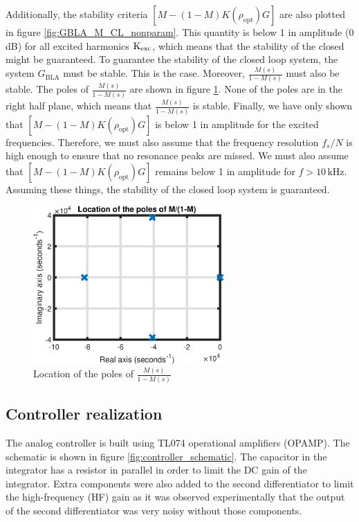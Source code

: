 Additionally, the stability criteria $[M - (1-M)K(\rho_{\mathrm{opt}})G]$ are also plotted in figure \ref{fig:GBLA_M_CL_nonparam}. This quantity is below 1 in amplitude (0 dB) for all excited harmonics $\text{K}_{\text{exc}}$, which means that the stability of the closed might be guaranteed. To guarantee the stability of the closed loop system, the system $G_{\mathrm{BLA}}$ must be stable. This is the case. Moreover, $\frac{M(s)}{1-M(s)}$ must also be stable. The poles of $\frac{M(s)}{1-M(s)}$ are shown in figure \ref{fig:M_one_minus_M_poles}. None of the poles are in the right half plane, which means that $\frac{M(s)}{1-M(s)}$ is stable. Finally, we have only shown that $[M - (1-M)K(\rho_{\mathrm{opt}})G]$ is below 1 in amplitude for the excited frequencies. Therefore, we must also assume that the frequency resolution $f_s/N$ is high enough to ensure that no resonance peaks are missed. We must also assume that $[M - (1-M)K(\rho_{\mathrm{opt}})G]$ remains below 1 in amplitude for $f > 10 \, \mathrm{kHz}$. Assuming these things, the stability of the closed loop system is guaranteed.

\begin{figure}[H]
\centering
\includegraphics[width = 0.65\textwidth]{figures/M_one_minus_M_poles.eps}
\caption{Location of the poles of $\frac{M(s)}{1-M(s)}$}
\label{fig:M_one_minus_M_poles}
\end{figure}

\subsection{Controller realization}
The analog controller is built using TL074 operational amplifiers (OPAMP). The schematic is shown in figure \ref{fig:controller_schematic}. The capacitor in the integrator has a resistor
in parallel in order to limit the DC gain of the integrator. Extra components were also added to the second differentiator to limit the high-frequency (HF) gain as it was observed experimentally that the output of the second differentiator was very noisy without those components.

